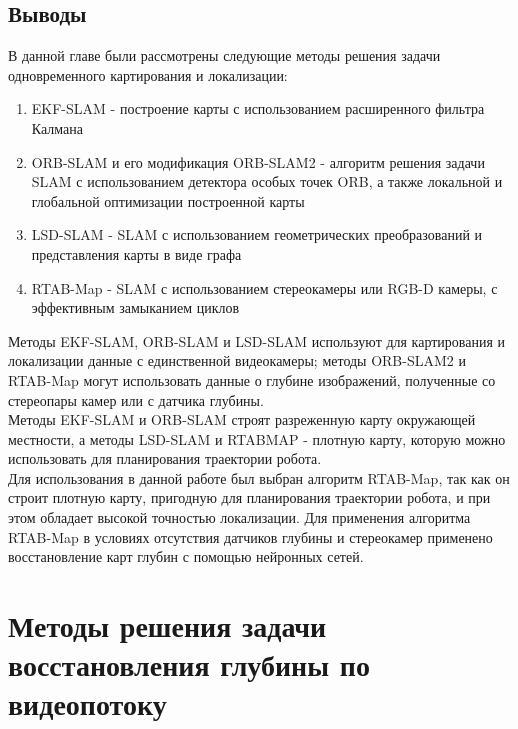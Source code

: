 \documentclass{mipt-thesis-bs}
\begin{document}
\section{Выводы}
В данной главе были рассмотрены следующие методы решения задачи одновременного картирования и локализации:
\begin{enumerate}
	\item {EKF-SLAM - построение карты с использованием расширенного фильтра Калмана}
	\item {ORB-SLAM и его модификация ORB-SLAM2 - алгоритм решения задачи SLAM с использованием детектора особых точек ORB, а также локальной и глобальной оптимизации построенной карты}
	\item {LSD-SLAM - SLAM с использованием геометрических преобразований и представления карты в виде графа}
	\item {RTAB-Map - SLAM с использованием стереокамеры или RGB-D камеры, с эффективным замыканием циклов}
\end{enumerate}
Методы EKF-SLAM, ORB-SLAM и LSD-SLAM используют для картирования и локализации данные с единственной видеокамеры; методы ORB-SLAM2 и RTAB-Map могут использовать данные о глубине изображений, полученные со стереопары камер или с датчика глубины.\\
Методы EKF-SLAM и ORB-SLAM строят разреженную карту окружающей местности, а методы LSD-SLAM и RTABMAP - плотную карту, которую можно использовать для планирования траектории робота.\\
Для использования в данной работе был выбран алгоритм RTAB-Map, так как он строит плотную карту, пригодную для планирования траектории робота, и при этом обладает высокой точностью локализации. Для применения алгоритма RTAB-Map в условиях отсутствия датчиков глубины и стереокамер применено восстановление карт глубин с помощью нейронных сетей.



\chapter{Методы решения задачи восстановления глубины по видеопотоку}
\end{document}

